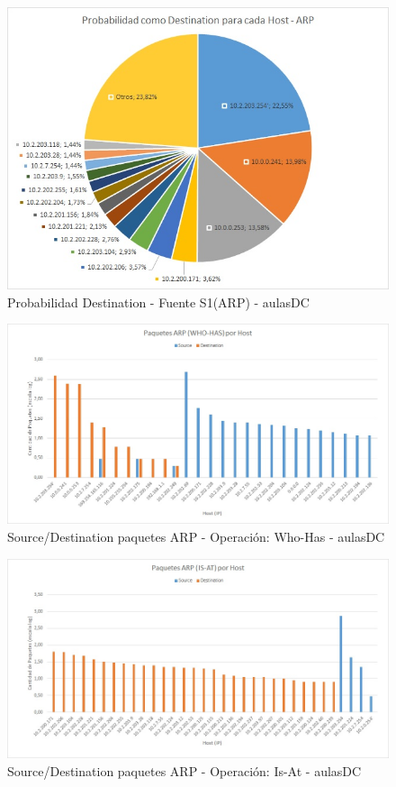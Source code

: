 \begin{figure}[h!]
\centering
\includegraphics[scale=0.6]{./img/proba_dst_aulasDC.jpg}
\caption{Probabilidad Destination - Fuente S1(ARP) - aulasDC}
\end{figure}
\newpage



\begin{figure}[h!]
\centering
\includegraphics[scale=0.7]{./img/arp_whoHas_aulasDC.jpg}
\caption{Source/Destination paquetes ARP - Operación: Who-Has - aulasDC}
\end{figure}

\begin{figure}[h!]
\centering
\includegraphics[scale=0.7]{./img/arp_isAt_aulasDC.jpg}
\caption{Source/Destination paquetes ARP - Operación: Is-At - aulasDC}
\end{figure}

